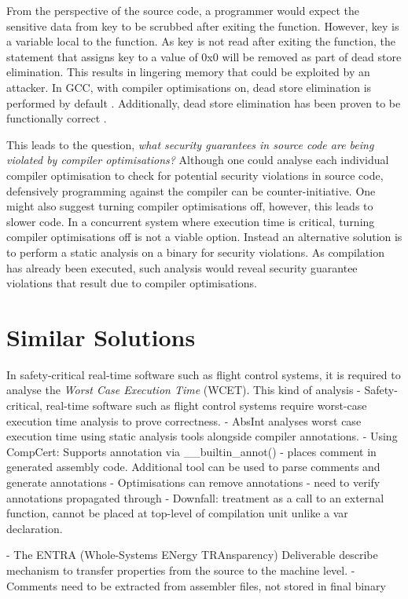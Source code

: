 \documentclass[twocolumn]{article}
\begin{document}
From the perspective of the source code, a programmer would expect the sensitive data from key to be scrubbed after exiting the function. However, key is a variable local to the function. As key is not read after exiting the function, the statement that assigns key to a value of 0x0 will be removed as part of dead store elimination. This results in lingering memory that could be exploited by an attacker. In GCC, with compiler optimisations on, dead store elimination is performed by default \cite{gccoptimise}. Additionally, dead store elimination has been proven to be functionally correct \cite{benton2004simple}\cite{leroy2006formal}.

This leads to the question, \textit{what security guarantees in source code are being violated by compiler optimisations?} Although one could analyse each individual compiler optimisation to check for potential security violations in source code, defensively programming against the compiler can be counter-initiative. One might also suggest turning compiler optimisations off, however, this leads to slower code. In a concurrent system where execution time is critical, turning compiler optimisations off is not a viable option. Instead an alternative solution is to perform a static analysis on a binary for security violations. As compilation has already been executed, such analysis would reveal security guarantee violations that result due to compiler optimisations.

\section{Similar Solutions}
In safety-critical real-time software such as flight control systems, it is required to analyse the \textit{Worst Case Execution Time} (WCET). This kind of analysis
- Safety-critical, real-time software such as flight control systems require worst-case execution time analysis to prove correctness.
-  AbsInt analyses worst case execution time using static analysis tools alongside compiler annotations.
- Using CompCert: Supports annotation via \_\_builtin\_annot() - places comment in generated assembly code. Additional tool can be used to parse comments and generate annotations
- Optimisations can remove annotations - need to verify annotations propagated through
- Downfall: treatment as a call to an external function, cannot be placed at top-level of compilation unit unlike a var declaration.

- The ENTRA (Whole-Systems ENergy TRAnsparency) Deliverable describe mechanism to transfer properties from the source to the machine level.
- Comments need to be extracted from assembler files, not stored in final binary
\end{document}
